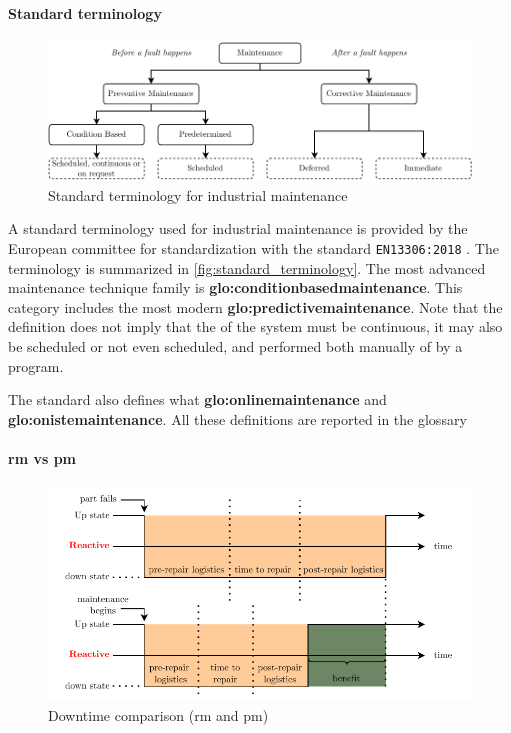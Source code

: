\paragraph{Standard terminology}
\begin{figure}
    \centering
    \includegraphics[width=\textwidth]{images/StateArt/EN_classification.drawio.pdf}
    \caption{Standard terminology for industrial maintenance \cite{rastegari2017condition}}
    \label{fig:standard_terminology}
\end{figure}

A standard terminology used for industrial maintenance is provided by the European committee for standardization with the standard \texttt{EN13306:2018} \cite{EN13306:2018}. The terminology is summarized in \autoref{fig:standard_terminology}. The most advanced maintenance technique family is \textbf{\gls{glo:conditionbasedmaintenance}}. This category includes the most modern \textbf{\gls{glo:predictivemaintenance}}. Note that the definition does not imply that the  of the system must be continuous, it may also be scheduled or not even scheduled, and performed both manually of by a program.

The standard also defines what \textbf{\gls{glo:onlinemaintenance}} and \textbf{\gls{glo:onistemaintenance}}. All these definitions are reported in the {glossary}


\paragraph{\gls{rm} vs \gls{pm}}
\begin{figure}
    \centering
    \includegraphics[width=\textwidth]{images/StateArt/lost_opportunities.pdf}
    \caption{Downtime comparison (\gls{rm} and \gls{pm})}
    \label{fig:lost_opportunities}
\end{figure}

